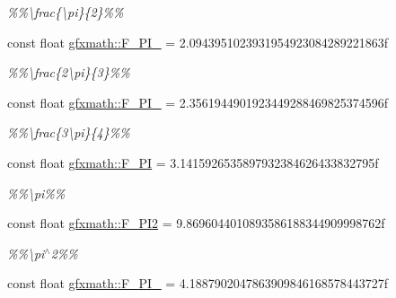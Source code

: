 \begin{DoxyCompactItemize}
\begin{DoxyCompactList}\small\item\em \%\%\textbackslash{}frac\{\textbackslash{}pi\}\{2\}\%\% \end{DoxyCompactList}\item 
\hypertarget{group___math_consts_gaf3d6bddb166a005a45bc10c5a28439db}{}const float \hyperlink{group___math_consts_gaf3d6bddb166a005a45bc10c5a28439db}{gfxmath\+::\+F\+\_\+P\+I\+\_} = 2.\+0943951023931954923084289221863f\label{group___math_consts_gaf3d6bddb166a005a45bc10c5a28439db}

\begin{DoxyCompactList}\small\item\em \%\%\textbackslash{}frac\{2\textbackslash{}pi\}\{3\}\%\% \end{DoxyCompactList}\item 
\hypertarget{group___math_consts_gadf574e6f68c342910912fe6689bcec97}{}const float \hyperlink{group___math_consts_gadf574e6f68c342910912fe6689bcec97}{gfxmath\+::\+F\+\_\+P\+I\+\_} = 2.\+3561944901923449288469825374596f\label{group___math_consts_gadf574e6f68c342910912fe6689bcec97}

\begin{DoxyCompactList}\small\item\em \%\%\textbackslash{}frac\{3\textbackslash{}pi\}\{4\}\%\% \end{DoxyCompactList}\item 
\hypertarget{group___math_consts_ga2c19b1c00458d0f6bd454617b337d468}{}const float \hyperlink{group___math_consts_ga2c19b1c00458d0f6bd454617b337d468}{gfxmath\+::\+F\+\_\+\+P\+I} = 3.\+1415926535897932384626433832795f\label{group___math_consts_ga2c19b1c00458d0f6bd454617b337d468}

\begin{DoxyCompactList}\small\item\em \%\%\textbackslash{}pi\%\% \end{DoxyCompactList}\item 
\hypertarget{group___math_consts_ga4102d0514ecc68aeb12772a49c507288}{}const float \hyperlink{group___math_consts_ga4102d0514ecc68aeb12772a49c507288}{gfxmath\+::\+F\+\_\+\+P\+I2} = 9.\+8696044010893586188344909998762f\label{group___math_consts_ga4102d0514ecc68aeb12772a49c507288}

\begin{DoxyCompactList}\small\item\em \%\%\textbackslash{}pi$^\wedge$2\%\% \end{DoxyCompactList}\item 
\hypertarget{group___math_consts_ga557a3cd249de463476b850a3e726f370}{}const float \hyperlink{group___math_consts_ga557a3cd249de463476b850a3e726f370}{gfxmath\+::\+F\+\_\+P\+I\+\_} = 4.\+1887902047863909846168578443727f\label{group___math_consts_ga557a3cd249de463476b850a3e726f370}


\end{DoxyCompactItemize}
